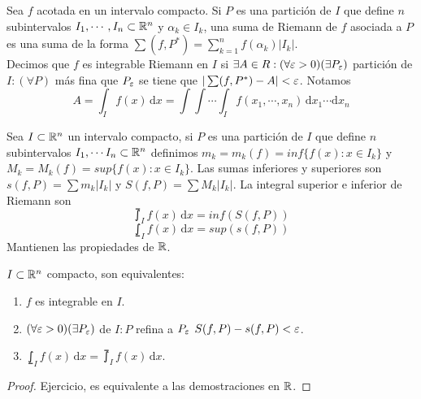 \begin{definition}
  Sea $f$ acotada en un intervalo compacto. Si $P$ es una partición de $I$ que define $n$ subintervalos $I_1, \cdots, I_n \subset \mathbb{R}^n$ y $\alpha_k \in I_k$, una suma de Riemann de $f$ asociada a $P$ es una suma de la forma $\sum (f, P^*) = \sum_{k = 1}^n f(\alpha_k) |I_k|$. \\
  Decimos que $f$ es integrable Riemann en $I$ si $\exists A \in R : (\forall \varepsilon > 0)(\exists P_{\varepsilon})$ partición de $I : (\forall P)$ más fina que $P_{\varepsilon}$ se tiene que $|\sum(f, P^*) - A| < \varepsilon$.
  Notamos \begin{equation}
    A =  \int_I f(x) \, \mathrm{d}x = \int \int \cdots \int_I f(x_1, \cdots, x_n)\, \mathrm{d}x_1 \cdots \mathrm{d}x_n
    \end{equation}
\end{definition}

\begin{definition}
  Sea $I \subset \mathbb{R}^n$ un intervalo compacto, si $P$ es una partición de $I$ que define $n$ subintervalos $I_1, \cdots I_n \subset \mathbb{R}^n$ definimos $m_k = m_k(f) = inf\{f(x) : x \in I_k\}$ y $M_k = M_k(f) = sup\{f(x) : x \in I_k\}$.
  Las sumas inferiores y superiores son $s(f, P) = \sum m_k |I_k|$ y $S(f, P) = \sum M_k |I_k|$.
  La integral superior e inferior de Riemann son \begin{equation}
    \upint_I f(x) \, \mathrm{d}x = inf(S(f, P))
  \end{equation}
  \begin{equation}
    \lowint_I f(x)\, \mathrm{d}x = sup(s(f, P))
  \end{equation}
  Mantienen las propiedades de $\mathbb{R}$.
\end{definition}

\begin{theorem}
  $I \subset \mathbb{R}^n$ compacto, son equivalentes:
  \begin{enumerate}
    \item $f$ es integrable en $I$.
    \item $(\forall \varepsilon > 0)(\exists P_{\varepsilon})$ de $I : P$ refina a $P_{\varepsilon}$ $S(f, P) - s(f, P) < \varepsilon$.
    \item $\lowint_I f(x) \, \mathrm{d}x = \upint_I f(x) \, \mathrm{d}x$.
  \end{enumerate}
  \begin{proof}
    Ejercicio, es equivalente a las demostraciones en $\mathbb{R}$.
  \end{proof}
\end{theorem}

